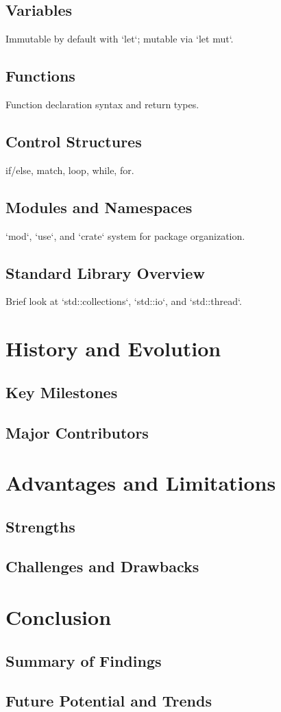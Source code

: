 \documentclass[a4paper,12pt]{article}
\begin{document}
\subsection{Variables}
Immutable by default with `let`; mutable via `let mut`.

\subsection{Functions}
Function declaration syntax and return types.

\subsection{Control Structures}
if/else, match, loop, while, for.

\subsection{Modules and Namespaces}
`mod`, `use`, and `crate` system for package organization.

\subsection{Standard Library Overview}
Brief look at `std::collections`, `std::io`, and `std::thread`.

\section{History and Evolution}
\subsection{Key Milestones}
\subsection{Major Contributors}

\section{Advantages and Limitations}
\subsection{Strengths}
\subsection{Challenges and Drawbacks}

\section{Conclusion}
\subsection{Summary of Findings}
\subsection{Future Potential and Trends}
\end{document}
